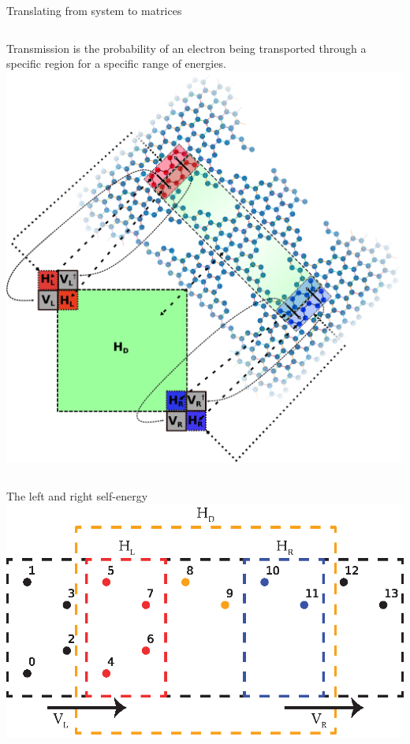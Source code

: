 \documentclass[hyperref={colorlinks=true,urlcolor=blue,linkcolor=.},aspectratio=1610,mathserif]{beamer}
\newcommand{\im}[3]{\inputminted[linenos=true, python3=true, firstline=#2, lastline=#3]{python}{#1}}
\begin{document}
\begin{frame}{Translating from system to matrices}
\centering
\begin{columns}[c]
		    Transmission is the probability of an electron being transported through a specific region for a specific range of energies.
			\includegraphics[width=\textwidth]{Figures/illu.eps}
\end{columns}
\end{frame}

\begin{frame}{The left and right self-energy}
    \centering
   \includegraphics[width=.9\textwidth]{Figures/2DHam.eps}
    \im{Listings/Functions.py}{210}{212}
\end{frame}
\end{document}
